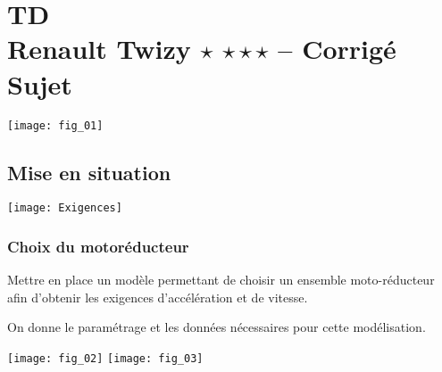 
\chapter*{TD  \\ 
Renault Twizy \ifnormal $\star$ \else \fi \iftdifficile $\star\star\star$ \else \fi -- \ifprof Corrigé \else Sujet \fi}

\iflivret {} \else
\ifprof  {} \else \fi
\fi

\setcounter{question}{0}


\begin{marginfigure} [2cm]
\texttt{[image: fig\_01]}
\end{marginfigure}



\section*{Mise en situation}
\ifprof
\else
\fi


\begin{center}
\texttt{[image: Exigences]}
\end{center}

\subsection*{Choix du motoréducteur}


\begin{obj}
Mettre en place un modèle permettant de choisir un ensemble moto-réducteur afin d’obtenir les
exigences d’accélération et de vitesse.
\end{obj}

On donne le paramétrage et les données nécessaires pour cette modélisation.


\begin{center}
\texttt{[image: fig\_02]}
\texttt{[image: fig\_03]}
\end{center}


